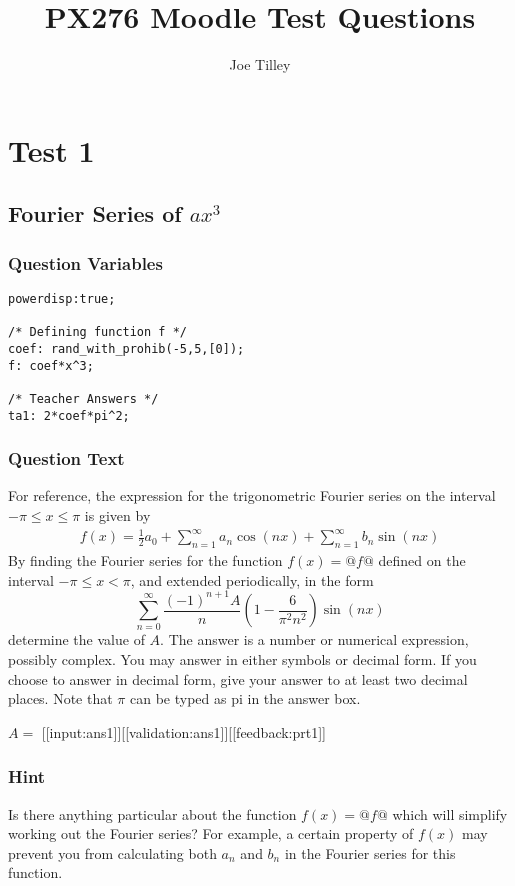 \documentclass[a4paper,10pt]{article}
\title{PX276 Moodle Test Questions}
\author{Joe Tilley}
\begin{document}
\maketitle
\section{Test 1}
\subsection{Fourier Series of $ax^{3}$}
\subsubsection{Question Variables}
\begin{lstlisting}
powerdisp:true;

/* Defining function f */
coef: rand_with_prohib(-5,5,[0]);
f: coef*x^3;

/* Teacher Answers */
ta1: 2*coef*pi^2;
\end{lstlisting}
\subsubsection{Question Text}
For reference, the expression for the trigonometric Fourier series on the interval $-\pi \leq x \leq \pi$ is given by \begin{align*}
f(x) = \frac{1}{2}a_0 + \sum_{n=1}^{\infty}a_n\cos(nx) + \sum_{n=1}^{\infty}b_n\sin(nx)
\end{align*}
By finding the Fourier series for the function \(f(x)=@f@\) defined on the interval \(-\pi \leq x < \pi \), and extended periodically, in the form \[ \sum_{n=0}^\infty \frac{(-1)^{n+1}A}{n}\left(1-\frac{6}{\pi^2n^2}\right)\sin(nx) \]determine the value of \(A\). The answer is a number or numerical expression, possibly complex. You may answer in either symbols or decimal form. If you choose to answer in decimal form, give your answer to at least two decimal places. Note that \(\pi\) can be typed as pi in the answer box.

\(A = \) [[input:ans1]][[validation:ans1]][[feedback:prt1]]
\subsubsection{Hint}
Is there anything particular about the function \(f(x) = @f@\) which will simplify working out the Fourier series? For example, a certain property of $f(x)$ may prevent you from calculating both \(a_n\) and \(b_n\) in the Fourier series for this function.
\end{document}
